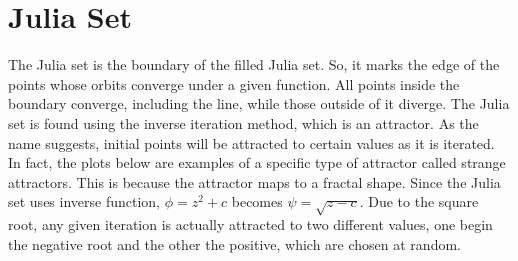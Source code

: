 \documentclass[letterpaper,11pt]{article}
\begin{document}
\section{Julia Set}
The Julia set is the boundary of the filled Julia set. So, it marks the edge of the points whose orbits converge under a given function. All points inside the boundary converge, including the line, while those outside of it diverge. The Julia set is found using the inverse iteration method, which is an attractor. As the name suggests, initial points will be attracted to certain values as it is iterated. In fact, the plots below are examples of a specific type of attractor called strange attractors. This is because the attractor maps to a fractal shape. Since the Julia set uses inverse function, $\phi = z^2 + c$ becomes  $\psi = \sqrt{z - c}$. Due to the square root, any given iteration is actually attracted to two different values, one begin the negative root and the other the positive, which are chosen at random.
\end{document}

